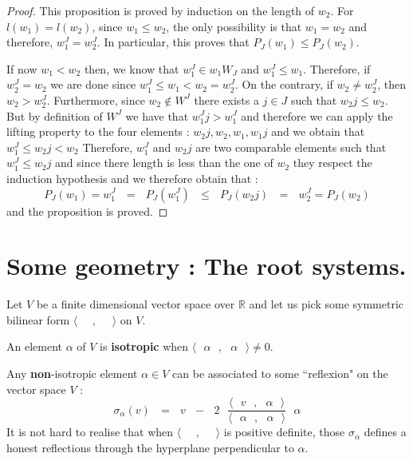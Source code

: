 \documentclass[envcountsame,envcountchap]{svmono}
\newcommand{\R}{\mathbb R}
\newcommand{\tg}[1]{\textbf{#1}}
\newcommand{\prods}[2]{\langle\qq #1\qq,\qq#2\qq\rangle}
\newcommand{\qq}{\text{ }}
\begin{document}
\begin{proof}
	This proposition is proved by induction on the length of $w_2$. For $l(w_1)=l(w_2)$, since $w_1\leq w_2$, the only possibility is that $w_1=w_2$ and therefore,  $w_1^J=w_2^J$. In particular, this proves that $P_J(w_1)\leq P_J(w_2)$.
	
	If now $w_1<w_2$ then, we know that $w_1^J\in w_1W_J$ and $w_1^J\leq w_1$. Therefore, if $w_2^J=w_2$ we are done since $w_1^J\leq w_1<w_2=w_2^J$. On the contrary, if $w_2\not=w_2^J$, then $w_2 > w_2^J$. Furthermore, since $w_2\not\in W^J$ there exists a $j\in J$ such that $w_2j\leq w_2$. But by definition of $W^J$ we have that $w_1^Jj>w_1^J$ and therefore we can apply the lifting property to the four elements : $w_2j, w_2, w_1, w_1j$ and we obtain that $w_1^J\leq w_2j < w_2$ Therefore, $w_1^J$ and $w_2j$ are two comparable elements such that $w_1^J\leq w_2j$ and since there length is less than the one of $w_2$ they respect the induction hypothesis and we therefore obtain that :
	\begin{equation}
	P_J(w_1)=w_1^J\qq=\qq P_J(w_1^J)\qq\leq \qq P_J(w_2 j)\qq=\qq w_2^J=P_J(w_2)
	\end{equation}
	and the proposition is proved.
\end{proof}

\section{Some geometry : The root systems.}
Let $V$ be a finite dimensional vector space over $\R$ and let us pick some symmetric bilinear form $\prods{}{}$ on $V$.
\begin{definition}
	An element $\alpha$ of $V$ is \tg{isotropic} when $\prods{\alpha}{\alpha}\not=0$. 
\end{definition}
Any \tg{non}-isotropic element $\alpha\in V$ can be associated to some ``reflexion" on the vector space $V$ :
\begin{equation}
\sigma_\alpha(v)\qq=\qq v\qq -\qq 2\qq \frac{\prods{v}{\alpha}}{\prods{\alpha}{\alpha}}\qq\alpha
\end{equation}
It is not hard to realise that when $\prods{}{}$ is positive definite, those $\sigma_\alpha$ defines a honest reflections through the hyperplane perpendicular to $\alpha$.
\end{document}
